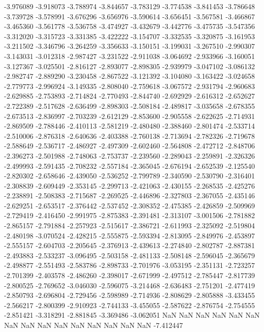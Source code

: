-3.976089
-3.918073
-3.788974
-3.844657
-3.783129
-3.774538
-3.841453
-3.786648
-3.739728
-3.578991
-3.676296
-3.656976
-3.590614
-3.656451
-3.567581
-3.466867
-3.465360
-3.561778
-3.536758
-3.474927
-3.432679
-3.442776
-3.475735
-3.547356
-3.312020
-3.315723
-3.331385
-3.422222
-3.154707
-3.332535
-3.320875
-3.161953
-3.211502
-3.346796
-3.264259
-3.356633
-3.150151
-3.199031
-3.267510
-2.990307
-3.143031
-3.012318
-2.987427
-3.231522
-2.911038
-3.064692
-2.933966
-3.160051
-3.127367
-3.025501
-2.816127
-2.893077
-2.898305
-2.939979
-3.047102
-3.086132
-2.982747
-2.889290
-3.230458
-2.867522
-3.121392
-3.104080
-3.163422
-3.024658
-2.779773
-2.996924
-3.149335
-2.808040
-2.759618
-3.067572
-2.931794
-2.960683
-2.629885
-2.753893
-2.714824
-2.770493
-2.844740
-2.692929
-2.616312
-2.652627
-2.722389
-2.517628
-2.636499
-2.898303
-2.508184
-2.489817
-3.035658
-2.678355
-2.673513
-2.836997
-2.703239
-2.612129
-2.853600
-2.905558
-2.622625
-2.714931
-2.869509
-2.788446
-2.410113
-2.581219
-2.480480
-2.388460
-2.801474
-2.533714
-2.510006
-2.876318
-2.640636
-2.403388
-2.760138
-2.713694
-2.782326
-2.719678
-2.588649
-2.536717
-2.486927
-2.497309
-2.602460
-2.564808
-2.472712
-2.848706
-2.396273
-2.501988
-2.748063
-2.753737
-2.239560
-2.289043
-2.259891
-2.326326
-2.499993
-2.591435
-2.708232
-2.557184
-2.365045
-2.676194
-2.652539
-2.125540
-2.820302
-2.658646
-2.439050
-2.536252
-2.799789
-2.340590
-2.530790
-2.316401
-2.308839
-2.609449
-2.353145
-2.299713
-2.421063
-2.430155
-2.268535
-2.425276
-2.238891
-2.508383
-2.715687
-2.269525
-2.446896
-2.327803
-2.367055
-2.435146
-2.629251
-2.653517
-2.376442
-2.537452
-2.308352
-2.475385
-2.426859
-2.509969
-2.729419
-2.416450
-2.991975
-2.875383
-2.391481
-2.313107
-3.001506
-2.781882
-2.865157
-2.791884
-2.257923
-2.515617
-2.386721
-2.611993
-2.325092
-2.519804
-2.480198
-3.070524
-2.428215
-2.555875
-2.593394
-2.813095
-2.849976
-2.453897
-2.555157
-2.604703
-2.205645
-2.376913
-2.439613
-2.274840
-2.802787
-2.887381
-2.493883
-2.533237
-3.096495
-2.503158
-2.481133
-2.508148
-2.596045
-2.365679
-2.498877
-2.551493
-2.583786
-2.898733
-2.701976
-3.053195
-2.351131
-2.723257
-2.701399
-2.403578
-2.486260
-2.398017
-2.671999
-2.497512
-2.785447
-2.817739
-2.800525
-2.769652
-3.046030
-2.596075
-3.214468
-2.636483
-2.751201
-2.477419
-2.850793
-2.696804
-2.729456
-2.598989
-2.714936
-2.808629
-2.805888
-3.433455
-2.566217
-2.800399
-2.910923
-2.744133
-3.455055
-2.587622
-2.876754
-2.754555
-2.851421
-3.318291
-2.881845
-3.369486
-3.062051
NaN
NaN
NaN
NaN
NaN
NaN
NaN
NaN
NaN
NaN
NaN
NaN
NaN
NaN
NaN
-7.412447
